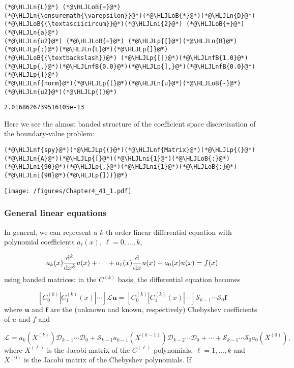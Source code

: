 \documentclass[12pt,a4paper]{article}
\newcommand{\HLJLn}[1]{#1}
\newcommand{\HLJLnf}[1]{\textcolor[RGB]{66,102,213}{#1}}
\newcommand{\HLJLnfB}[1]{\textcolor[RGB]{59,151,46}{#1}}
\newcommand{\HLJLni}[1]{\textcolor[RGB]{59,151,46}{#1}}
\newcommand{\HLJLoB}[1]{\textcolor[RGB]{102,102,102}{\textbf{#1}}}
\newcommand{\HLJLp}[1]{#1}
\begin{document}
\begin{lstlisting}
(*@\HLJLn{L}@*) (*@\HLJLoB{=}@*) (*@\HLJLn{\ensuremath{\varepsilon}}@*)(*@\HLJLoB{*}@*)(*@\HLJLn{D}@*)(*@\HLJLoB{{\textasciicircum}}@*)(*@\HLJLni{2}@*) (*@\HLJLoB{+}@*) (*@\HLJLn{a}@*)
(*@\HLJLn{u2}@*) (*@\HLJLoB{=}@*) (*@\HLJLp{[}@*)(*@\HLJLn{B}@*)(*@\HLJLp{;}@*)(*@\HLJLn{L}@*)(*@\HLJLp{]}@*) (*@\HLJLoB{{\textbackslash}}@*) (*@\HLJLp{[[}@*)(*@\HLJLnfB{1.0}@*)(*@\HLJLp{,}@*)(*@\HLJLnfB{0.0}@*)(*@\HLJLp{],}@*)(*@\HLJLnfB{0.0}@*)(*@\HLJLp{]}@*)
(*@\HLJLnf{norm}@*)(*@\HLJLp{(}@*)(*@\HLJLn{u}@*)(*@\HLJLoB{-}@*)(*@\HLJLn{u2}@*)(*@\HLJLp{)}@*)
\end{lstlisting}

\begin{lstlisting}
2.0168626739516105e-13
\end{lstlisting}


Here we see the almost banded structure of the coefficient space discretisation of the boundary-value problem:


\begin{lstlisting}
(*@\HLJLnf{spy}@*)(*@\HLJLp{(}@*)(*@\HLJLnf{Matrix}@*)(*@\HLJLp{(}@*)(*@\HLJLn{A}@*)(*@\HLJLp{[}@*)(*@\HLJLni{1}@*)(*@\HLJLoB{:}@*)(*@\HLJLni{90}@*)(*@\HLJLp{,}@*)(*@\HLJLni{1}@*)(*@\HLJLoB{:}@*)(*@\HLJLni{90}@*)(*@\HLJLp{]))}@*)
\end{lstlisting}

\texttt{[image: /figures/Chapter4\_41\_1.pdf]}

\subsubsection{General linear equations}
In general, we can represent a $k$-th order linear differential equation with polynomial coefficients $a_{\ell}(x)$, $\ell = 0, \ldots, k$, 

\[
a_k(x)\frac{{\rm d}^k}{{\rm d}x^k}u(x) + \cdots + a_1(x)\frac{{\rm d}}{{\rm d}x}u(x) + a_0(x)u(x) = f(x)
\]
using banded matrices: in the $C^{(k)}$ basis, the differential equation becomes

\[
\left[ C_0^{(k)} | C_1^{(k)}(x) | \cdots    \right]\mathcal{L}\mathbf{u} = \left[ C_0^{(k)} | C_1^{(k)}(x) | \cdots    \right]\mathcal{S}_{k-1}\cdots\mathcal{S}_0\mathbf{f}
\]
where $\mathbf{u}$ and $\mathbf{f}$ are the (unknown and known, respectively) Chebyshev coefficients of $u$ and $f$ and 

\[
\mathcal{L} = a_k(X^{(k)})\mathcal{D}_{k-1}\cdots\mathcal{D}_0 + \mathcal{S}_{k-1}a_{k-1}(X^{(k-1)})\mathcal{D}_{k-2}\cdots\mathcal{D}_0 + \cdots + \mathcal{S}_{k-1}\cdots\mathcal{S}_{0}a_{0}(X^{(0)}),
\]
where $X^{(\ell)}$ is the Jacobi matrix of the $C^{(\ell)}$ polynomials, $\ell = 1, \ldots, k$ and  $X^{(0)}$ is the Jacobi matrix of the Chebyshev polynomials.  If 
\end{document}
